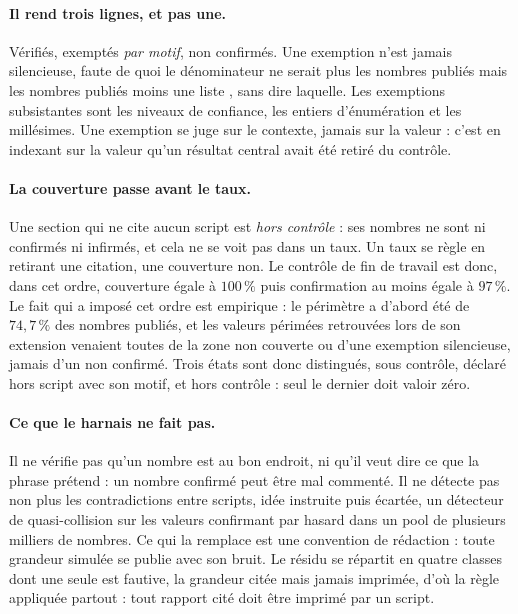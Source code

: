 \paragraph{Il rend trois lignes, et pas une.} Vérifiés, exemptés \emph{par motif}, non confirmés.
Une exemption n'est jamais silencieuse, faute de quoi le dénominateur ne serait plus \og les
nombres publiés \fg{} mais \og les nombres publiés moins une liste \fg{}, sans dire laquelle. Les
exemptions subsistantes sont les niveaux de confiance, les entiers d'énumération et les
millésimes. Une exemption se juge sur le contexte, jamais sur la valeur : c'est en indexant sur la
valeur qu'un résultat central avait été retiré du contrôle.

\paragraph{La couverture passe avant le taux.} Une section qui ne cite aucun script est \emph{hors
contrôle} : ses nombres ne sont ni confirmés ni infirmés, et cela ne se voit pas dans un taux. Un
taux se règle en retirant une citation, une couverture non. Le contrôle de fin de travail est donc,
dans cet ordre, couverture égale à $100\,\%$ puis confirmation au moins égale à $97\,\%$. Le fait
qui a imposé cet ordre est empirique : le périmètre a d'abord été de $74{,}7\,\%$ des nombres
publiés, et les valeurs périmées retrouvées lors de son extension venaient toutes de la zone non
couverte ou d'une exemption silencieuse, jamais d'un non confirmé. Trois états sont donc
distingués, sous contrôle, déclaré hors script avec son motif, et hors contrôle : seul le dernier
doit valoir zéro.

\paragraph{Ce que le harnais ne fait pas.} Il ne vérifie pas qu'un nombre est au bon endroit, ni
qu'il veut dire ce que la phrase prétend : un nombre confirmé peut être mal commenté. Il ne détecte
pas non plus les contradictions entre scripts, idée instruite puis écartée, un détecteur de
quasi-collision sur les valeurs confirmant par hasard dans un pool de plusieurs milliers de
nombres. Ce qui la remplace est une convention de rédaction : toute grandeur simulée se publie avec
son bruit. Le résidu se répartit en quatre classes dont une seule est fautive, la grandeur citée
mais jamais imprimée, d'où la règle appliquée partout : tout rapport cité doit être imprimé par un
script.

